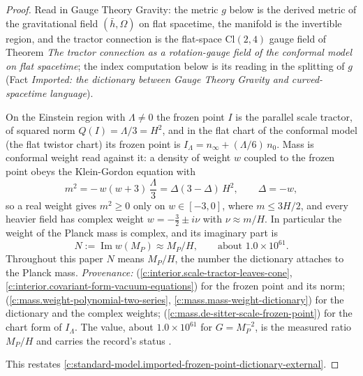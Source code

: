\documentclass[11pt]{article}
\theoremstyle{definition}
\theoremstyle{plain}
\providecommand{\Cl}{}\renewcommand{\Cl}{\mathrm{Cl}}
\providecommand{\hb}{}\renewcommand{\hb}{\bar{h}}
\begin{document}
\begin{proof}
Read in Gauge Theory Gravity: the metric $g$ below is the derived metric of the gravitational field $(\hb, \Omega)$ on flat spacetime, the manifold is the invertible region, and the tractor connection is the flat-space $\Cl(2,4)$ gauge field of Theorem \emph{The tractor connection as a rotation-gauge field of the conformal model on flat spacetime}; the index computation below is its reading in the splitting of $g$ (Fact \emph{Imported: the dictionary between Gauge Theory Gravity and curved-spacetime language}).

On the Einstein region with $\Lambda \neq 0$ the frozen point $I$ is the parallel scale tractor, of squared norm $Q(I) = \Lambda/3 = H^{2}$, and in the flat chart of the conformal model (the flat twistor chart) its frozen point is $I_{\Lambda} = n_{\infty} + (\Lambda/6)\,n_{0}$. Mass is conformal weight read against it: a density of weight $w$ coupled to the frozen point obeys the Klein-Gordon equation with
\[
m^{2} = -\,w(w+3)\,\frac{\Lambda}{3} = \Delta(3-\Delta)\,H^{2}, \qquad \Delta = -w,
\]
so a real weight gives $m^{2} \ge 0$ only on $w \in [-3, 0]$, where $m \le 3H/2$, and every heavier field has complex weight $w = -\tfrac32 \pm i\nu$ with $\nu \approx m/H$. In particular the weight of the Planck mass is complex, and its imaginary part is
\[
N := \operatorname{Im} w(M_{P}) \approx M_{P}/H, \qquad\text{about } 1.0 \times 10^{61}.
\]
Throughout this paper $N$ means $M_{P}/H$, the number the dictionary attaches to the Planck mass. \emph{Provenance:} \cite[Thms.~4.5, 4.7]{ButlerT6} (\ref{c:interior.scale-tractor-leaves-cone}, \ref{c:interior.covariant-form-vacuum-equations}) for the frozen point and its norm; \cite[Thm.~3.1, Cor.~3.2]{ButlerT11} (\ref{c:mass.weight-polynomial-two-series}, \ref{c:mass.mass-weight-dictionary}) for the dictionary and the complex weights; \cite[Lem.~5.1]{ButlerT11} (\ref{c:mass.de-sitter-scale-frozen-point}) for the chart form of $I_{\Lambda}$. The value, about $1.0 \times 10^{61}$ for $G = M_{P}^{-2}$, is the measured ratio $M_{P}/H$ and carries the record's status \cite{PDG2024}.

This restates \ref{c:standard-model.imported-frozen-point-dictionary-external}.

\end{proof}
\end{document}

